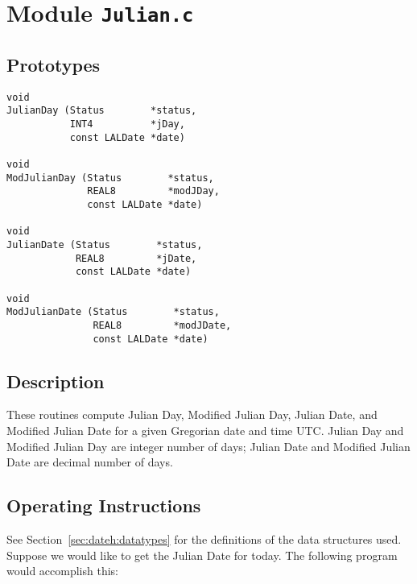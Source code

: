 \section{Module \texttt{Julian.c}}

\subsection{Prototypes}
\begin{verbatim}
void
JulianDay (Status        *status,
           INT4          *jDay,
           const LALDate *date)

void
ModJulianDay (Status        *status,
              REAL8         *modJDay,
              const LALDate *date)

void
JulianDate (Status        *status,
            REAL8         *jDate,
            const LALDate *date)

void
ModJulianDate (Status        *status,
               REAL8         *modJDate,
               const LALDate *date)
\end{verbatim}


\subsection{Description}

These routines compute Julian Day, Modified Julian Day, Julian Date, and
Modified Julian Date for a given Gregorian date and time UTC.  Julian Day
and Modified Julian Day are integer number of days; Julian Date and
Modified Julian Date are decimal number of days.

\subsection{Operating Instructions}
See Section~\ref{sec:dateh:datatypes} for the definitions of the
data structures used.  Suppose we would like to get the Julian Date for
today.  The following program would accomplish this:

